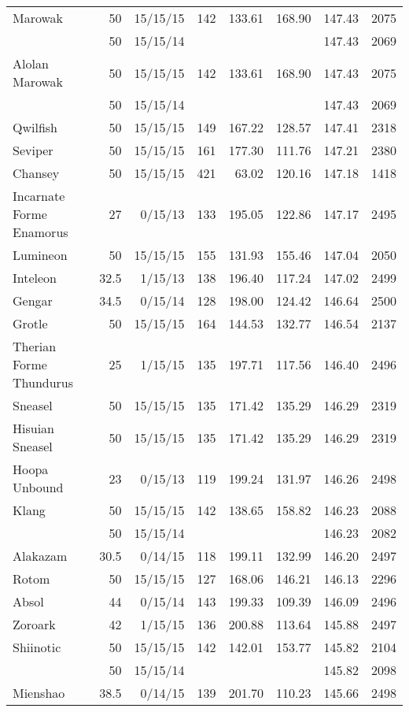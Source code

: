 \begin{longtable}{lrrrrrrr}
Marowak & 50 & 15/15/15 & 142 & 133.61 & 168.90 & 147.43 & 2075\\
 & 50 & 15/15/14 & & & & 147.43 & 2069\\
Alolan Marowak & 50 & 15/15/15 & 142 & 133.61 & 168.90 & 147.43 & 2075\\
 & 50 & 15/15/14 & & & & 147.43 & 2069\\
Qwilfish & 50 & 15/15/15 & 149 & 167.22 & 128.57 & 147.41 & 2318\\
Seviper & 50 & 15/15/15 & 161 & 177.30 & 111.76 & 147.21 & 2380\\
Chansey & 50 & 15/15/15 & 421 & 63.02 & 120.16 & 147.18 & 1418\\
Incarnate Forme Enamorus & 27 & 0/15/13 & 133 & 195.05 & 122.86 & 147.17 & 2495\\
Lumineon & 50 & 15/15/15 & 155 & 131.93 & 155.46 & 147.04 & 2050\\
Inteleon & 32.5 & 1/15/13 & 138 & 196.40 & 117.24 & 147.02 & 2499\\
Gengar & 34.5 & 0/15/14 & 128 & 198.00 & 124.42 & 146.64 & 2500\\
Grotle & 50 & 15/15/15 & 164 & 144.53 & 132.77 & 146.54 & 2137\\
Therian Forme Thundurus & 25 & 1/15/15 & 135 & 197.71 & 117.56 & 146.40 & 2496\\
Sneasel & 50 & 15/15/15 & 135 & 171.42 & 135.29 & 146.29 & 2319\\
Hisuian Sneasel & 50 & 15/15/15 & 135 & 171.42 & 135.29 & 146.29 & 2319\\
Hoopa Unbound & 23 & 0/15/13 & 119 & 199.24 & 131.97 & 146.26 & 2498\\
Klang & 50 & 15/15/15 & 142 & 138.65 & 158.82 & 146.23 & 2088\\
 & 50 & 15/15/14 & & & & 146.23 & 2082\\
Alakazam & 30.5 & 0/14/15 & 118 & 199.11 & 132.99 & 146.20 & 2497\\
Rotom & 50 & 15/15/15 & 127 & 168.06 & 146.21 & 146.13 & 2296\\
Absol & 44 & 0/15/14 & 143 & 199.33 & 109.39 & 146.09 & 2496\\
Zoroark & 42 & 1/15/15 & 136 & 200.88 & 113.64 & 145.88 & 2497\\
Shiinotic & 50 & 15/15/15 & 142 & 142.01 & 153.77 & 145.82 & 2104\\
 & 50 & 15/15/14 & & & & 145.82 & 2098\\
Mienshao & 38.5 & 0/14/15 & 139 & 201.70 & 110.23 & 145.66 & 2498\\

\end{longtable}

